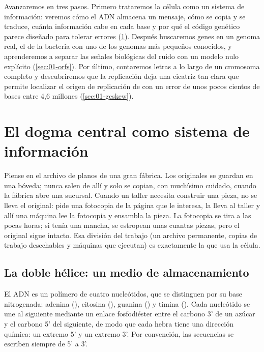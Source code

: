 Avanzaremos en tres pasos. Primero trataremos la célula como un sistema de información: veremos cómo el ADN almacena un mensaje, cómo se copia y se traduce, cuánta información cabe en cada base y por qué el código genético parece diseñado para tolerar errores (\cref{sec:01-dogma}). Después buscaremos genes en un genoma real, el de la bacteria con uno de los genomas más pequeños conocidos, y aprenderemos a separar las señales biológicas del ruido con un modelo nulo explícito (\cref{sec:01-orfs}). Por último, contaremos letras a lo largo de un cromosoma completo y descubriremos que la replicación deja una cicatriz tan clara que permite localizar el origen de replicación de  con un error de unos pocos cientos de bases entre 4,6 millones (\cref{sec:01-gcskew}).

\section{El dogma central como sistema de información}\label{sec:01-dogma}

\begin{intuicion}
Piense en el archivo de planos de una gran fábrica. Los originales se guardan en una bóveda; nunca salen de allí y solo se copian, con muchísimo cuidado, cuando la fábrica abre una sucursal. Cuando un taller necesita construir una pieza, no se lleva el original: pide una fotocopia de la página que le interesa, la lleva al taller y allí una máquina lee la fotocopia y ensambla la pieza. La fotocopia se tira a las pocas horas; si tenía una mancha, se estropean unas cuantas piezas, pero el original sigue intacto. Esa división del trabajo (un archivo permanente, copias de trabajo desechables y máquinas que ejecutan) es exactamente la que usa la célula.
\end{intuicion}

\subsection{La doble hélice: un medio de almacenamiento}

El ADN es un polímero de cuatro nucleótidos, que se distinguen por su base nitrogenada: adenina (), citosina (), guanina () y timina (). Cada nucleótido se une al siguiente mediante un enlace fosfodiéster entre el carbono 3' de un azúcar y el carbono 5' del siguiente, de modo que cada hebra tiene una dirección química: un extremo 5' y un extremo 3'. Por convención, las secuencias se escriben siempre de 5' a 3'.

